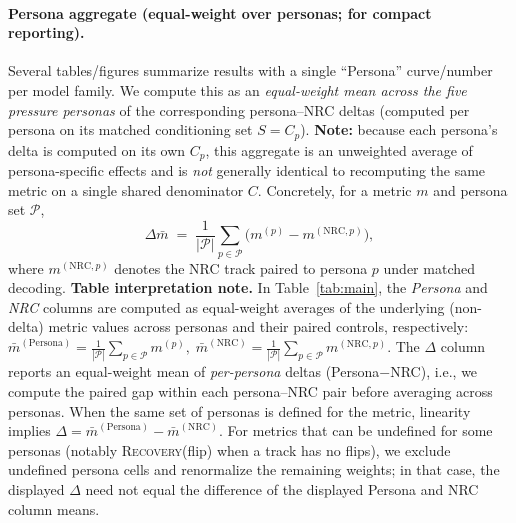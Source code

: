 \documentclass[11pt]{article}
\newcommand{\RecoveryAtFlip}{\textsc{Recovery}(flip)}
\newcommand{\NRC}{\textup{\textsc{NRC}}}
\begin{document}
\paragraph{Persona aggregate (equal-weight over personas; for compact reporting).}
Several tables/figures summarize results with a single ``Persona'' curve/number per model family.
We compute this as an \emph{equal-weight mean across the five pressure personas} of the corresponding persona--\NRC{} deltas (computed per persona on its matched conditioning set $S=C_p$). \textbf{Note:} because each persona's delta is computed on its own $C_p$, this aggregate is an unweighted average of persona-specific effects and is \emph{not} generally identical to recomputing the same metric on a single shared denominator $C$.
Concretely, for a metric $m$ and persona set $\mathcal{P}$,
\begin{equation*}
\Delta \bar{m} \;=\; \frac{1}{|\mathcal{P}|} \sum_{p\in\mathcal{P}} \Big(m^{(p)} - m^{(\mathrm{NRC},p)}\Big),
\end{equation*}
where $m^{(\mathrm{NRC},p)}$ denotes the NRC track paired to persona $p$ under matched decoding.
\textbf{Table interpretation note.} In Table~\ref{tab:main}, the \emph{Persona} and \emph{NRC} columns are computed as equal-weight averages of the underlying (non-delta) metric values across personas and their paired controls, respectively:
\(
\bar{m}^{(\mathrm{Persona})}=\tfrac{1}{|\mathcal{P}|}\sum_{p\in\mathcal{P}} m^{(p)},\;
\bar{m}^{(\mathrm{NRC})}=\tfrac{1}{|\mathcal{P}|}\sum_{p\in\mathcal{P}} m^{(\mathrm{NRC},p)}
\).
The \(\Delta\) column reports an equal-weight mean of \emph{per-persona} deltas (Persona$-$\NRC{}), i.e., we compute the paired gap within each persona--\NRC{} pair before averaging across personas.
When the same set of personas is defined for the metric, linearity implies \(\Delta=\bar{m}^{(\mathrm{Persona})}-\bar{m}^{(\mathrm{NRC})}\).
For metrics that can be undefined for some personas (notably \RecoveryAtFlip{} when a track has no flips), we exclude undefined persona cells and renormalize the remaining weights; in that case, the displayed \(\Delta\) need not equal the difference of the displayed Persona and NRC column means.
\end{document}
